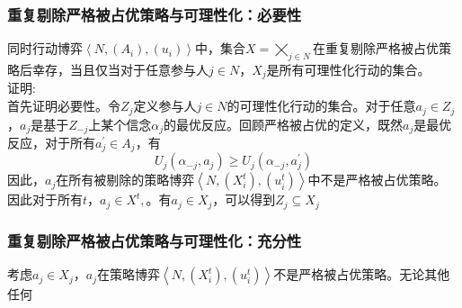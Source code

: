 \documentclass{beamer}
\begin{document}
\begin{frame}
	\frametitle{重复剔除严格被占优策略与可理性化：必要性}
	同时行动博弈$\left\langle N,\left(A_{i}\right),\left(u_{i}\right)\right\rangle$中，集合$X = \bigtimes\limits_{j\in N}$在重复剔除严格被占优策略后幸存，当且仅当对于任意参与人$j\in N$，$X_{j}$是所有可理性化行动的集合。\\
	\alert{证明}:\\
	首先证明必要性。令$Z_{j}$定义参与人$j\in N$的可理性化行动的集合。对于任意$a_{j}\in Z_{j}$，$a_{j}$是基于$Z_{-j}$上某个信念$\alpha_{j}$的最优反应。回顾严格被占优的定义，既然$a_{j}$是最优反应，对于所有$a_{j}^{'}\in A_{j}$，有
	$$U_{j}\left(\alpha_{-j},a_{j}\right)\geq U_{j}\left(\alpha_{-j},a_{j}^{'}\right)$$
	因此，$a_{j}$在所有被剔除的策略博弈$\left\langle N,\left(X_{i}^{t}\right),\left(u_{i}^{t}\right)\right\rangle$中不是严格被占优策略。\\
	因此对于所有$t$，$a_{j}\in X^{t},$。有$a_{j}\in X_{j}$，可以得到$Z_{j}\subseteq X_{j}$
\end{frame}

\begin{frame}
	\frametitle{重复剔除严格被占优策略与可理性化：充分性}
	考虑$a_{j}\in X_{j}$，$a_{j}$在策略博弈$\left\langle N,\left(X_{i}^{t}\right),\left(u_{i}^{t}\right)\right\rangle$不是严格被占优策略。无论其他任何
\end{frame}
\end{document}
